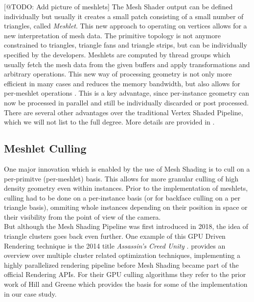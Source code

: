 [@TODO: Add picture of meshlets]
\noindent
The Mesh Shader output can be defined individually but usually it creates a small patch consisting of a small 
number of triangles, called \emph{Meshlet}. This new approach to operating on vertices allows for a new interpretation 
of mesh data. The primitive topology is not anymore constrained to triangles, triangle fans and triangle strips, 
but can be individually specified by the developers.
Meshlets are computed by thread groups which usually fetch the mesh data from the given buffers and apply 
transformations and arbitrary operations. This new way of processing geometry is not only more efficient in many cases 
and reduces the memory bandwidth, but also allows for per-meshlet operations \cite{Kubisch2020}. This is a key 
advantage, since per-instance geometry can now be processed in parallel and still be individually discarded or post 
processed. There are several other advantages over the traditional Vertex Shaded Pipeline, which we will not list to 
the full degree. More details are provided in \cite{Kubisch2020}.\\


\subsection{Meshlet Culling} \label{subsec-meshlet-culling}

One major innovation which is enabled by the use of Mesh Shading is to cull on a per-primitve (per-meshlet) basis. 
This allows for more granular culling of high density geometry even within instances. Prior to the implementation 
of meshlets, culling had to be done on a per-instance basis (or for backface culling on a per triangle basis), 
ommiting whole instances depending on their position in space or their visibility from the point of view of the camera.\\

\noindent
But although the Mesh Shading Pipeline was first introduced in 2018, the idea of triangle clusters goes back even further.
One example of this \ac{GPU} Driven Rendering technique is the 2014 title \emph{Assassin's Creed Unity} \cite{Ubisoft2014}.
\cite{Aaltonen2015} provides an overview over multiple cluster related optimization techniques, implementing a highly 
parallelized rendering pipeline before Mesh Shading became part of the official Rendering \ac{API}s.
For their \ac{GPU} culling algorithms they refer to the prior work of Hill \cite{Hill11} and Greene \cite{Greene93} which 
provides the basis for some of the implementation in our case study.


